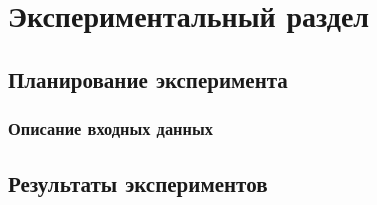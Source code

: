 \chapter{Экспериментальный раздел}
\label{seq:experiment}

\section{Планирование эксперимента}

\subsection{Описание входных данных}

\section{Результаты экспериментов}

